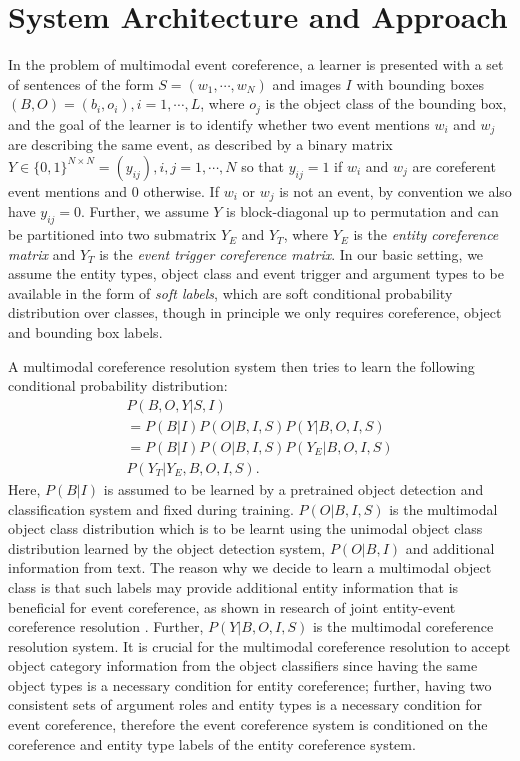 \documentclass[11pt,a4paper]{article}
\begin{document}
\section{System Architecture and Approach}
In the problem of multimodal event coreference, a learner is presented with a set of sentences of the form $S = (w_1, \cdots, w_N)$ and images $I$ with bounding boxes $(B, O) = (b_i, o_i), i=1, \cdots, L$, where $o_j$ is the object class of the bounding box, and the goal of the learner is to identify whether two event mentions $w_i$ and $w_j$ are describing the same event, as described by a binary matrix $Y \in \{0, 1\}^{N \times N} = (y_{ij}), i,j=1,\cdots,N$ so that $y_{ij}=1$ if $w_i$ and $w_j$ are coreferent event mentions and 0 otherwise. If $w_i$ or $w_j$ is not an event, by convention we also have $y_{ij}=0$. Further, we assume $Y$ is block-diagonal up to permutation and can be partitioned into two submatrix $Y_E$ and $Y_T$, where $Y_E$ is the \textit{entity coreference matrix} and $Y_T$ is the \textit{event trigger coreference matrix}. In our basic setting, we assume the entity types, object class and event trigger and argument types to be available in the form of \textit{soft labels}, which are soft conditional probability distribution over classes, though in principle we only requires coreference, object and bounding box labels.

A multimodal coreference resolution system then tries to learn the following conditional probability distribution:
\begin{multline}\label{eq:likelihood}
    P(B, O, Y|S, I)\\ 
    = P(B|I) P(O|B, I, S) P(Y|B, O, I, S)\\
    = P(B|I) P(O|B, I, S) P(Y_E|B, O, I, S)\\ 
    P(Y_T|Y_E, B, O, I, S).
\end{multline}
Here, $P(B|I)$ is assumed to be learned by a pretrained object detection and classification system and fixed during training. $P(O|B, I, S)$ is the multimodal object class distribution which is to be learnt using the unimodal object class distribution learned by the object detection system, $P(O|B, I)$ and additional information from text. The reason why we decide to learn a multimodal object class is that such labels may provide additional entity information that is beneficial for event coreference, as shown in research of joint entity-event coreference resolution \cite{Lee2012-joint-entity-event-coref}. Further, $P(Y|B, O, I, S)$ is the multimodal coreference resolution system. It is crucial for the multimodal coreference resolution to accept object category information from the object classifiers since having the same object types is a necessary condition for entity coreference; further, having two consistent sets of argument roles and entity types is a necessary condition for event coreference, therefore the event coreference system is conditioned on the coreference and entity type labels of the entity coreference system.    
\end{document}
